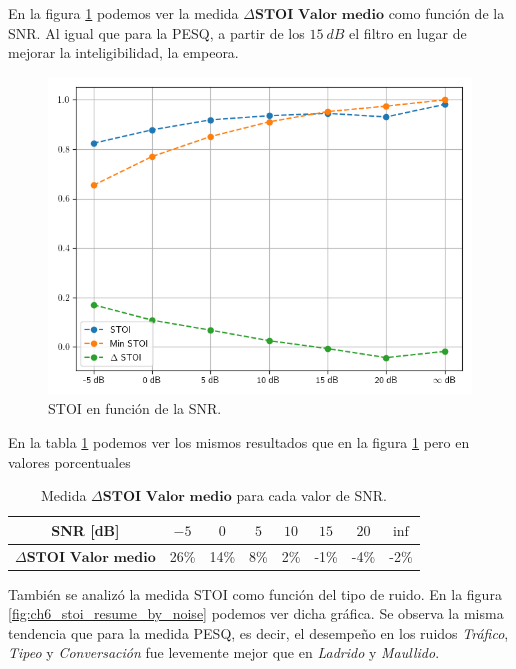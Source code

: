 En la figura \ref{fig:ch6_stoi_resume} podemos ver la medida $\Delta \textbf{STOI Valor medio}$ como función de la SNR. Al igual que para la PESQ, a partir de los $\SI{15}{dB}$ el filtro en lugar de mejorar la inteligibilidad, la empeora.

\begin{figure}
	\centering
	\centerline{\includegraphics[scale=0.75]{images/ch6/af/objective_metrics/metric_STOI.png}}
	\caption{STOI en función de la SNR.}
	\label{fig:ch6_stoi_resume}
\end{figure}

En la tabla \ref{table:stoi_resume} podemos ver los mismos resultados que en la figura \ref{fig:ch6_stoi_resume} pero en valores porcentuales

\begin{table}[ht]
	\centering
	\begin{tabular}{ |c|c|c|c|c|c|c|c| } 
		\hline
		SNR [dB] & $-5$ & $0$ & $5$ & $10$ & $15$ & $20$ & $\inf$ \\ 
		\hline
		$\Delta \textbf{STOI Valor medio}$ & 26\%  & 14\%  & 8\% & 2\% & -1\% & -4\% & -2\% \\
		\hline
	\end{tabular}
	\caption{Medida $\Delta \textbf{STOI Valor medio}$ para cada valor de SNR.}
	\label{table:stoi_resume}
\end{table}

También se analizó la medida STOI como función del tipo de ruido. En la figura \ref{fig:ch6_stoi_resume_by_noise} podemos ver dicha gráfica. Se observa la misma tendencia que para la medida PESQ, es decir, el desempeño en los ruidos \emph{Tráfico}, \emph{Tipeo} y \emph{Conversación} fue levemente mejor que en \emph{Ladrido} y \emph{Maullido}.

